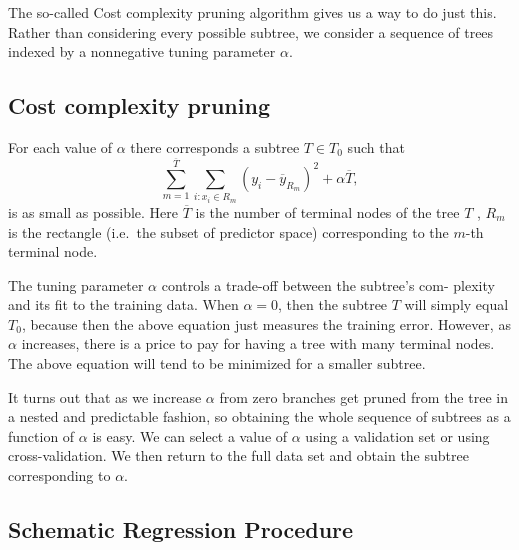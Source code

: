 \documentclass[%
oneside,                 %
final,                   %
10pt]{article}
\begin{document}
The so-called Cost complexity pruning algorithm gives us a
way to do just this. Rather than considering every possible subtree,
we consider a sequence of trees indexed by a nonnegative tuning
parameter $\alpha$.

\subsection{Cost complexity pruning}
For each value of $\alpha$  there corresponds a subtree $T \in T_0$ such that
\[
\sum_{m=1}^{\overline{T}}\sum_{i:x_i\in R_m}(y_i-\overline{y}_{R_m})^2+\alpha\overline{T},
\]
is as small as possible. Here $\overline{T}$ is 
the number of terminal nodes of the tree $T$ , $R_m$ is the
rectangle (i.e.~the subset of predictor space)  corresponding to the $m$-th terminal node.

The tuning parameter $\alpha$ controls a trade-off between the subtree’s
com- plexity and its fit to the training data. When $\alpha = 0$, then the
subtree $T$ will simply equal $T_0$, 
because then the above equation just measures the
training error. 
However, as $\alpha$ increases, there is a price to pay for
having a tree with many terminal nodes. The above equation will
tend to be minimized for a smaller subtree. 


It turns out that as we increase $\alpha$ from zero
branches get pruned from the tree in a nested and predictable fashion,
so obtaining the whole sequence of subtrees as a function of $\alpha$ is
easy. We can select a value of $\alpha$ using a validation set or using
cross-validation. We then return to the full data set and obtain the
subtree corresponding to $\alpha$. 


\subsection{Schematic Regression Procedure}


\end{document}
